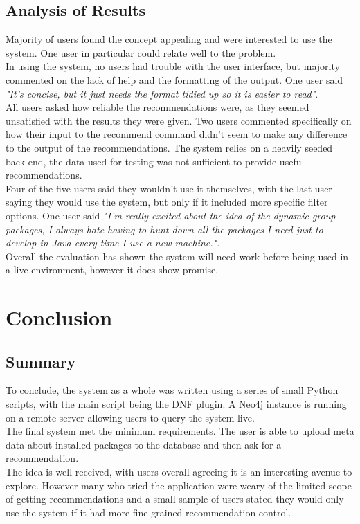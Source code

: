 \documentclass{l4proj}
\begin{document}
\section{Analysis of Results}
Majority of users found the concept appealing and were interested to use the system. One user in particular could relate well to the problem.\\
In using the system, no users had trouble with the user interface, but majority commented on the lack of help and the formatting of the output. One user said \emph{"It's concise, but it just needs the format tidied up so it is easier to read"}.\\
All users asked how reliable the recommendations were, as they seemed unsatisfied with the results they were given. Two users commented specifically on how their input to the recommend command didn't seem to make any difference to the output of the recommendations. The system relies on a heavily seeded back end, the data used for testing was not sufficient to provide useful recommendations.\\
Four of the five users said they wouldn't use it themselves, with the last user saying they would use the system, but only if it included more specific filter options. One user said \emph{"I'm really excited about the idea of the dynamic group packages, I always hate having to hunt down all the packages I need just to develop in Java every time I use a new machine."}.\\
Overall the evaluation has shown the system will need work before being used in a live environment, however it does show promise.
 
 
\chapter{Conclusion}

\section{Summary}
To conclude, the system as a whole was written using a series of small Python scripts, with the main script being the DNF plugin. A Neo4j instance is running on a remote server allowing users to query the system live.\\
The final system met the minimum requirements. The user is able to upload meta data about installed packages to the database and then ask for a recommendation.\\
The idea is well received, with users overall agreeing it is an interesting avenue to explore. However many who tried the application were weary of the limited scope of getting recommendations and a small sample of users stated they would only use the system if it had more fine-grained recommendation control.
\end{document}
